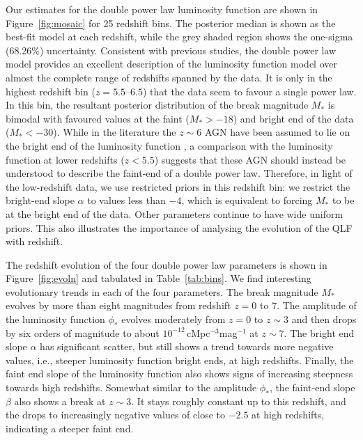 \documentclass[fleqn,usenatbib]{mnras}
\begin{document}
Our estimates for the double power law luminosity function are shown
in Figure~\ref{fig:mosaic} for 25 redshift bins.  The posterior median
is shown as the best-fit model at each redshift, while the grey shaded
region shows the one-sigma (68.26\%) uncertainty.  Consistent with
previous studies, the double power law model provides an excellent
description of the luminosity function model over almost the complete
range of redshifts spanned by the data.  It is only in the highest
redshift bin ($z=5.5$--$6.5$) that the data seem to favour a single
power law.  In this bin, the resultant posterior distribution of the
break magnitude $M_*$ is bimodal with favoured values at the faint
($M_*>-18$) and bright end of the data ($M_*<-30$).  While in the
literature the $z\sim 6$ AGN have been assumed to lie on the bright
end of the luminosity function \citep[e.g.,][]{2016ApJ...833..222J}, a
comparison with the luminosity function at lower redshifts ($z<5.5$)
suggests that these AGN should instead be understood to describe the
faint-end of a double power law.  Therefore, in light of the
low-redshift data, we use restricted priors in this redshift bin: we
restrict the bright-end slope $\alpha$ to values less than $-4$, which
is equivalent to forcing $M_*$ to be at the bright end of the data.
Other parameters continue to have wide uniform priors.  This also
illustrates the importance of analysing the evolution of the QLF with
redshift.

The redshift evolution of the four double power law parameters is
shown in Figure~\ref{fig:evoln} and tabulated in Table~\ref{tab:bins}.
We find interesting evolutionary trends in each
of the four parameters.  The break magnitude $M_*$ evolves by more
than eight magnitudes from redshift $z=0$ to $7$.  The amplitude of
the luminosity function $\phi_*$ evolves moderately from $z=0$ to
$z\sim 3$ and then drops by six orders of magnitude to about
$10^{-12}$\,cMpc$^{-3}$mag$^{-1}$ at $z\sim 7$.  The bright end slope $\alpha$ has
significant scatter, but still shows a trend towards more negative
values, i.e., steeper luminosity function bright ends, at high
redshifts.  Finally, the faint end slope of the luminosity function also
shows signs of increasing steepness towards high redshifts.
Somewhat similar to the amplitude $\phi_*$, the faint-end slope $\beta$ also
shows a break at $z\sim 3$.  It stays roughly constant up to this
redshift, and the drops to increasingly negative values of close to
$-2.5$ at high redshifts, indicating a steeper faint end.
\end{document}
